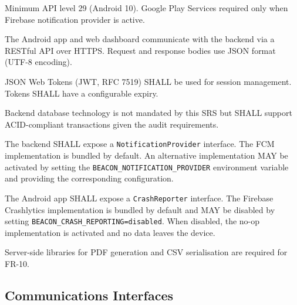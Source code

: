 \documentclass[12pt, a4paper]{article}
\begin{document}
\begin{description}[leftmargin=3cm, style=nextline]
    \item[Android SDK]
        Minimum API level 29 (Android 10). Google Play Services required
        only when Firebase notification provider is active.
    \item[REST API]
        The Android app and web dashboard communicate with the backend
        via a RESTful API over HTTPS. Request and response bodies use
        JSON format (UTF-8 encoding).
    \item[Authentication]
        JSON Web Tokens (JWT, RFC 7519) SHALL be used for session
        management. Tokens SHALL have a configurable expiry.
    \item[Database]
        Backend database technology is not mandated by this SRS but SHALL
        support ACID-compliant transactions given the audit requirements.
    \item[Notification Provider Interface]
        The backend SHALL expose a \texttt{NotificationProvider}
        interface. The FCM implementation is bundled by default. An
        alternative implementation MAY be activated by setting the
        \texttt{BEACON\_NOTIFICATION\_PROVIDER} environment variable
        and providing the corresponding configuration.
    \item[Crash Reporting Interface]
        The Android app SHALL expose a \texttt{CrashReporter} interface.
        The Firebase Crashlytics implementation is bundled by default
        and MAY be disabled by setting
        \texttt{BEACON\_CRASH\_REPORTING=disabled}. When disabled, the
        no-op implementation is activated and no data leaves the device.
    \item[Export Libraries]
        Server-side libraries for PDF generation and CSV serialisation
        are required for FR-10.
\end{description}

\subsection{Communications Interfaces}
\end{document}
